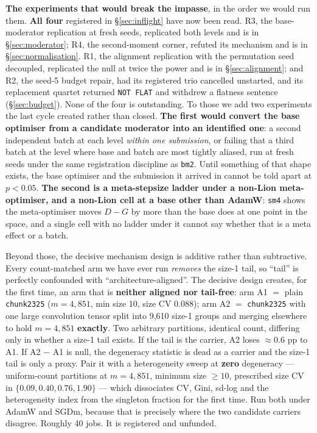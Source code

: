 \documentclass[10pt,letterpaper]{article}
\newcommand{\Dstat}{D}                         %
\newcommand{\Gstat}{G}                         %
\newcommand{\arm}[1]{\texttt{#1}}
\begin{document}
\textbf{The experiments that would break the impasse}, in the order we would run them. \textbf{All
four} registered in \S\ref{sec:inflight} have now been read. R3, the base-moderator replication at
fresh seeds, replicated both levels and is in \S\ref{sec:moderator}; R4, the second-moment corner,
refuted its mechanism and is in \S\ref{sec:normalisation}. R1, the alignment replication with the
permutation seed decoupled, replicated the null at twice the power and is in
\S\ref{sec:alignment}; and R2, the seed-5 budget repair, had its registered trio cancelled
unstarted, and its replacement quartet returned \texttt{NOT FLAT} and withdrew a flatness sentence
(\S\ref{sec:budget}). None of the four is outstanding. To those we add two experiments the
last cycle created rather than closed. \textbf{The first would convert the base optimiser from a
candidate moderator into an identified one}: a second independent batch at each level
\emph{within one submission}, or failing that a third batch at the level where base and batch are
most tightly aliased, run at fresh seeds under the same registration discipline as \arm{bm2}. Until
something of that shape exists, the base optimiser and the submission it arrived in cannot be told
apart at $p < 0.05$. \textbf{The second is a meta-stepsize ladder under a non-Lion meta-optimiser,
and a non-Lion cell at a base other than AdamW}: \arm{sm4} shows the meta-optimiser moves
$\Dstat - \Gstat$ by more than the base does at one point in the space, and a single cell with no
ladder under it cannot say whether that is a meta effect or a batch.

Beyond those, the decisive mechanism design is additive rather than subtractive. Every
count-matched arm we have ever run \emph{removes} the size-1 tail, so ``tail'' is perfectly
confounded with ``architecture-aligned''. The decisive design creates, for the first time, an arm
that is \textbf{neither aligned nor tail-free}: arm A1 $=$ plain \arm{chunk2325} ($m = 4{,}851$,
min size 10, size CV 0.088); arm A2 $=$ \arm{chunk2325} with one large convolution tensor split
into 9{,}610 size-1 groups and merging elsewhere to hold $m = 4{,}851$ \textbf{exactly}. Two
arbitrary partitions, identical count, differing only in whether a size-1 tail exists. If the tail
is the carrier, A2 loses $\approx 0.6$ pp to A1. If A2 $-$ A1 is null, the degeneracy statistic is
dead as a carrier and the size-1 tail is only a proxy. Pair it with a heterogeneity sweep at
\textbf{zero} degeneracy --- uniform-count partitions at $m = 4{,}851$, minimum size $\ge 10$,
prescribed size CV in $\{0.09, 0.40, 0.76, 1.90\}$ --- which dissociates CV, Gini, sd-log and the
heterogeneity index from the singleton fraction for the first time. Run both under AdamW and SGDm,
because that is precisely where the two candidate carriers disagree. Roughly 40 jobs. It is
registered and unfunded.
\end{document}
